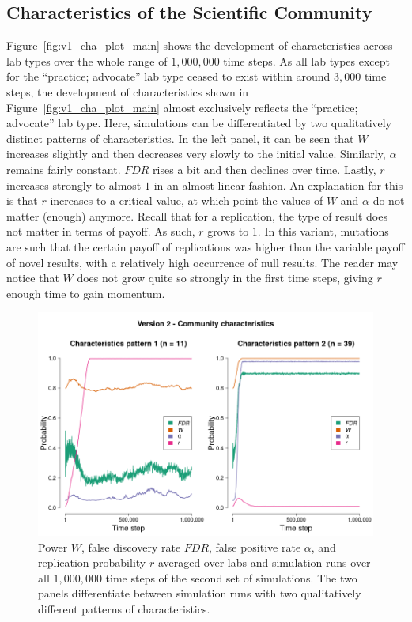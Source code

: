 \documentclass[meta, authordate]{jote-new-article}
\begin{document}
\subsection{Characteristics of the Scientific Community}

Figure~\ref{fig:v1_cha_plot_main} shows the development of characteristics across lab types over the whole range of $1,000,000$ time steps. As all lab types except for the ``practice; advocate'' lab type ceased to exist within around $3,000$ time steps, the development of characteristics shown in Figure~\ref{fig:v1_cha_plot_main} almost exclusively reflects the ``practice; advocate'' lab type. Here, simulations can be differentiated by two qualitatively distinct patterns of characteristics. In the left panel, it can be seen that $W$ increases slightly and then decreases very slowly to the initial value. Similarly, $\alpha$ remains fairly constant. $FDR$ rises a bit and then declines over time. Lastly, $r$ increases strongly to almost $1$ in an almost linear fashion. An explanation for this is that $r$ increases to a critical value, at which point the values of $W$ and $\alpha$ do not matter (enough) anymore. Recall that for a replication, the type of result does not matter in terms of payoff. As such, $r$ grows to $1$. In this variant, mutations are such that the certain payoff of replications was higher than the variable payoff of novel results, with a relatively high occurrence of null results. The reader may notice that $W$ does not grow quite so strongly in the first time steps, giving $r$ enough time to gain momentum.
%
%

\begin{figure}[!t]
  \begin{fullwidth}
    \centering
    \includegraphics[width=\textwidth]{v2_cha_plot_main.png}
    \caption{Power $W$, false discovery rate $FDR$, false positive rate $\alpha$, and replication probability $r$ averaged over labs and simulation runs over all $1,000,000$ time steps of the second set of simulations. The two panels differentiate between simulation runs with two qualitatively different patterns of characteristics.}
    \label{fig:v2_cha_plot_main}
  \end{fullwidth}
\end{figure}
\end{document}
